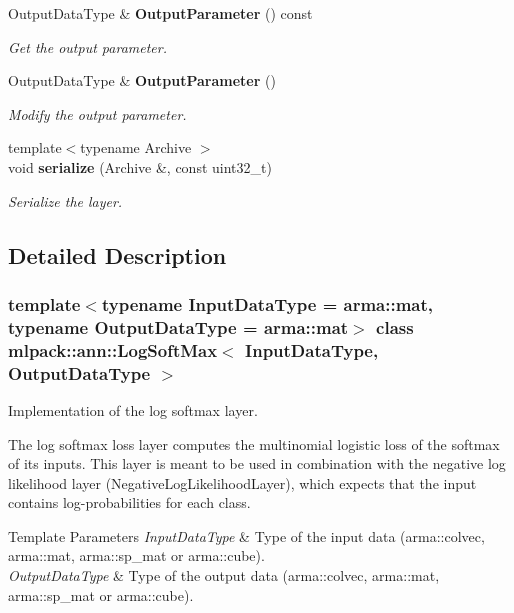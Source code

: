 \begin{DoxyCompactItemize}
Output\+Data\+Type \& \textbf{ Output\+Parameter} () const
\begin{DoxyCompactList}\small\item\em Get the output parameter. \end{DoxyCompactList}\item 
Output\+Data\+Type \& \textbf{ Output\+Parameter} ()
\begin{DoxyCompactList}\small\item\em Modify the output parameter. \end{DoxyCompactList}\item 
{\footnotesize template$<$typename Archive $>$ }\\void \textbf{ serialize} (Archive \&, const uint32\+\_\+t)
\begin{DoxyCompactList}\small\item\em Serialize the layer. \end{DoxyCompactList}\end{DoxyCompactItemize}


\subsection{Detailed Description}
\subsubsection*{template$<$typename Input\+Data\+Type = arma\+::mat, typename Output\+Data\+Type = arma\+::mat$>$\newline
class mlpack\+::ann\+::\+Log\+Soft\+Max$<$ Input\+Data\+Type, Output\+Data\+Type $>$}

Implementation of the log softmax layer. 

The log softmax loss layer computes the multinomial logistic loss of the softmax of its inputs. This layer is meant to be used in combination with the negative log likelihood layer (Negative\+Log\+Likelihood\+Layer), which expects that the input contains log-\/probabilities for each class.


\begin{DoxyTemplParams}{Template Parameters}
{\em Input\+Data\+Type} & Type of the input data (arma\+::colvec, arma\+::mat, arma\+::sp\+\_\+mat or arma\+::cube). \\
\hline
{\em Output\+Data\+Type} & Type of the output data (arma\+::colvec, arma\+::mat, arma\+::sp\+\_\+mat or arma\+::cube). \\
\hline
\end{DoxyTemplParams}


